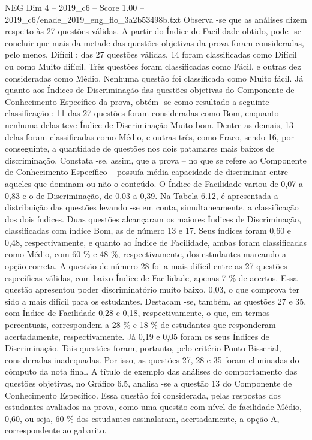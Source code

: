 \begin{textsample}{NEG Dim 4 – 2019\_c6 – Score 1.00 – 2019\_c6/enade\_2019\_eng\_flo\_3a2b53498b.txt}
Observa -se que as análises dizem respeito às 27 questões válidas.
A partir do Índice de Facilidade obtido, pode -se concluir que mais da metade das questões objetivas da prova foram consideradas, pelo menos, Difícil : das 27 questões válidas, 14 foram classificadas como Difícil ou como Muito difícil.
Três questões foram classificadas como Fácil, e outras dez consideradas como Médio.
Nenhuma questão foi classificada como Muito fácil.
Já quanto aos Índices de Discriminação das questões objetivas do Componente de Conhecimento Específico da prova, obtém -se como resultado a seguinte classificação : 11 das 27 questões foram consideradas como Bom, enquanto nenhuma delas teve Índice de Discriminação Muito bom.
Dentre as demais, 13 delas foram classificadas como Médio, e outras três, como Fraco, sendo 16, por conseguinte, a quantidade de questões nos dois patamares mais baixos de discriminação.
Constata -se, assim, que a prova – no que se refere ao Componente de Conhecimento Específico – possuía média capacidade de discriminar entre aqueles que dominam ou não o conteúdo.
O Índice de Facilidade variou de 0,07 a 0,83 e o de Discriminação, de 0,03 a 0,39.
Na Tabela 6.12, é apresentada a distribuição das questões levando -se em conta, simultaneamente, a classificação dos dois índices.
Duas questões alcançaram os maiores Índices de Discriminação, classificadas com índice Bom, as de número 13 e 17.
Seus índices foram 0,60 e 0,48, respectivamente, e quanto ao Índice de Facilidade, ambas foram classificadas como Médio, com 60 \% e 48 \%, respectivamente, dos estudantes marcando a opção correta.
A questão de número 28 foi a mais difícil entre as 27 questões específicas válidas, com baixo Índice de Facilidade, apenas 7 \% de acertos.
Essa questão apresentou poder discriminatório muito baixo, 0,03, o que comprova ter sido a mais difícil para os estudantes.
Destacam -se, também, as questões 27 e 35, com Índice de Facilidade 0,28 e 0,18, respectivamente, o que, em termos percentuais, correspondem a 28 \% e 18 \% de estudantes que responderam acertadamente, respectivamente.
Já 0,19 e 0,05 foram os seus Índices de Discriminação.
Tais questões foram, portanto, pelo critério Ponto-Bisserial, consideradas inadequadas.
Por isso, as questões 27, 28 e 35 foram eliminadas do cômputo da nota final.
A título de exemplo das análises do comportamento das questões objetivas, no Gráfico 6.5, analisa -se a questão 13 do Componente de Conhecimento Específico.
Essa questão foi considerada, pelas respostas dos estudantes avaliados na prova, como uma questão com nível de facilidade Médio, 0,60, ou seja, 60 \% dos estudantes assinalaram, acertadamente, a opção A, correspondente ao gabarito.

\end{textsample}
